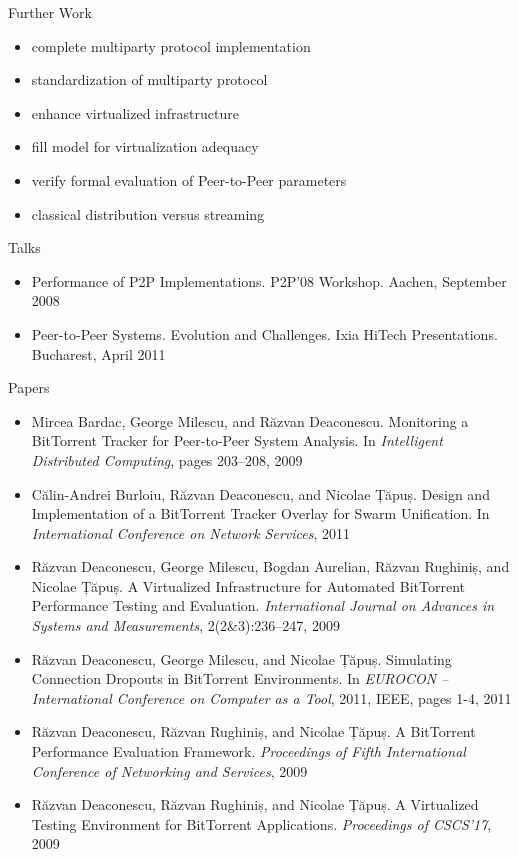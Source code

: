 \documentclass{beamer}
\begin{document}
\begin{frame}{Further Work}
  \begin{itemize}
    \item complete multiparty protocol implementation
    \item standardization of multiparty protocol
    \item enhance virtualized infrastructure
    \item fill model for virtualization adequacy
    \item verify formal evaluation of Peer-to-Peer parameters
    \item classical distribution versus streaming
  \end{itemize}
\end{frame}

\begin{frame}{Talks}
  \begin{itemize}
    \item Performance of P2P Implementations. P2P'08 Workshop. Aachen, September
    2008
    \item Peer-to-Peer Systems. Evolution and Challenges. Ixia HiTech
    Presentations. Bucharest, April 2011
  \end{itemize}
\end{frame}

\begin{frame}{Papers}
  \begin{itemize}
    \item Mircea Bardac, George Milescu, and Răzvan Deaconescu. Monitoring a
    BitTorrent Tracker for Peer-to-Peer System Analysis. In \textit{Intelligent
    Distributed Computing}, pages 203--208, 2009
    \item Călin-Andrei Burloiu, Răzvan Deaconescu, and Nicolae Țăpuș. Design and
    Implementation of a BitTorrent Tracker Overlay for Swarm Unification. In
    \textit{International Conference on Network Services}, 2011
    \item Răzvan Deaconescu, George Milescu, Bogdan Aurelian, Răzvan Rughiniș,
    and Nicolae Țăpuș. A Virtualized Infrastructure for Automated BitTorrent
    Performance Testing and Evaluation. \textit{International Journal on
    Advances in Systems and Measurements}, 2(2\&3):236--247, 2009
    \item Răzvan Deaconescu, George Milescu, and Nicolae Țăpuș. Simulating
    Connection Dropouts in BitTorrent Environments. In \textit{EUROCON --
    International Conference on Computer as a Tool}, 2011, IEEE, pages 1-4, 2011
    \item Răzvan Deaconescu, Răzvan Rughiniș, and Nicolae Țăpuș. A BitTorrent
    Performance Evaluation Framework. \textit{Proceedings of Fifth International
    Conference of Networking and Services}, 2009
    \item Răzvan Deaconescu, Răzvan Rughiniș, and Nicolae Țăpuș. A Virtualized
    Testing Environment for BitTorrent Applications. \textit{Proceedings of
    CSCS'17}, 2009
  \end{itemize}
\end{frame}
\end{document}
